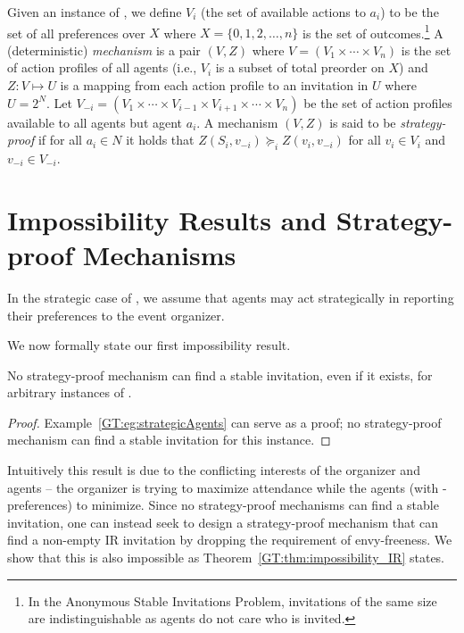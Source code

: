 \begin{definition} \label{GT:def:mechanism}
Given an instance of \ASIP, we define $V_i$ (the set of available actions to $a_i$) to be the set of all preferences over $X$ where $X = \{0, 1, 2, \dots, n\}$ is the set of outcomes.\footnote{In the Anonymous Stable Invitations Problem, invitations of the same size are indistinguishable as agents do not care who is invited.} 
A (deterministic) \emph{mechanism} is a pair $(V, Z)$ where $V = (V_1 \times \cdots \times V_n)$ is the set of action profiles of all agents (i.e., $V_i$ is a subset of total preorder on $X$) and $Z: V \mapsto U$ is a mapping from each action profile to an invitation in $U$ where $U = 2^{N}$. 
Let $V_{-i} = (V_1 \times \cdots \times V_{i-1} \times V_{i+1} \times \cdots \times V_{n})$ be the set of action profiles available to all agents but agent $a_i$. A mechanism $(V, Z)$ is said to be \emph{strategy-proof} if for all $a_i\in N$ it holds that $Z(S_i, v_{-i}) \succeq_i Z(v_i, v_{-i})$ for all $v_i \in V_i$ and $v_{-i} \in V_{-i}$.
\end{definition}
 




\section{Impossibility Results and Strategy-proof Mechanisms} \label{GT:sec:Mechanism}
In the strategic case of \ASIP, we assume that agents may act strategically in reporting their preferences to the event organizer. 


We now formally state our first impossibility result.
\begin{theorem} \label{GT:thm:impossibility}
No strategy-proof mechanism can find a stable invitation, even if it exists, for arbitrary instances of \ASIP.
\end{theorem}
\begin{proof}
Example~\ref{GT:eg:strategicAgents} can serve as a proof; no strategy-proof mechanism can find a stable invitation for this instance.  
\end{proof}
Intuitively this result is due to the conflicting interests of the organizer and agents -- the organizer is trying to maximize attendance while the agents (with \DEC-preferences) to minimize. 
Since no strategy-proof mechanisms can find a stable invitation, 
one can instead seek to design a strategy-proof mechanism that can find a non-empty IR invitation 
by dropping the requirement of envy-freeness.
We show that this is also impossible as Theorem~\ref{GT:thm:impossibility_IR} states.

